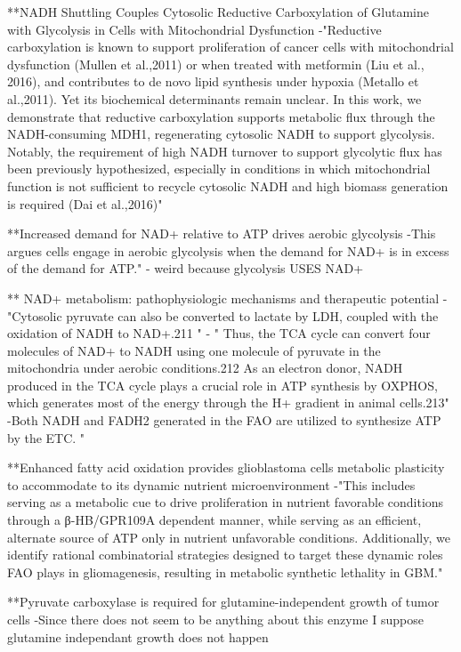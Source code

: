 \documentclass[11pt,a4paper]{article}
\begin{document}
**NADH Shuttling Couples Cytosolic Reductive Carboxylation of Glutamine with Glycolysis in Cells with Mitochondrial Dysfunction
-"Reductive carboxylation is known to support proliferation of cancer cells with mitochondrial dysfunction (Mullen et al.,2011) or when treated with metformin (Liu et al., 2016), and contributes to de novo lipid synthesis under hypoxia (Metallo et al.,2011). Yet its biochemical determinants remain unclear. In this work, we demonstrate that reductive carboxylation supports metabolic flux through the NADH-consuming MDH1, regenerating cytosolic NADH to support glycolysis. Notably, the requirement of high NADH turnover to support glycolytic flux has been previously hypothesized, especially in conditions in which mitochondrial function is not sufficient to recycle cytosolic NADH and high biomass generation is required (Dai et al.,2016)"

**Increased demand for NAD+ relative to ATP drives aerobic glycolysis
-This argues cells engage in aerobic glycolysis when the demand for NAD+ is in excess of the demand for ATP."
- weird because glycolysis USES NAD+

** NAD+ metabolism: pathophysiologic mechanisms and therapeutic potential
- "Cytosolic pyruvate can also be converted to lactate by LDH, coupled with the oxidation of NADH to NAD+.211 "
- " Thus, the TCA cycle can convert four molecules of NAD+ to NADH using one molecule of pyruvate in the mitochondria under aerobic conditions.212 As an electron donor, NADH produced in the TCA cycle plays a crucial role in ATP synthesis by OXPHOS, which generates most of the energy through the H+ gradient in animal cells.213"
-Both NADH and FADH2 generated in the FAO are utilized to synthesize ATP by the ETC. "

**Enhanced fatty acid oxidation provides glioblastoma cells metabolic plasticity to accommodate to its dynamic nutrient microenvironment
-"This includes serving as a metabolic cue to drive proliferation in nutrient favorable conditions through a β-HB/GPR109A dependent manner, while serving as an efficient, alternate source of ATP only in nutrient unfavorable conditions. Additionally, we identify rational combinatorial strategies designed to target these dynamic roles FAO plays in gliomagenesis, resulting in metabolic synthetic lethality in GBM."

**Pyruvate carboxylase is required for glutamine-independent growth of tumor cells 
-Since there does not seem to be anything about this enzyme I suppose glutamine independant growth does not happen
\end{document}
